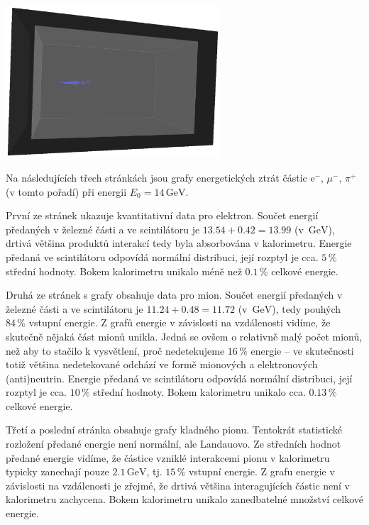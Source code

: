 \documentclass[10pt,a4paper]{article}
\renewcommand{\U}[1]{\ensuremath{\,\mathrm{#1}}}
\newcommand{\°}{\degree}
\renewcommand{\t}[1]{\mathrm{#1}}
\begin{document}
\phantom{.}
\begin{minipage}{\linewidth}
    \vspace{\baselineskip}
    \centering
    \vspace{\baselineskip}
    \includegraphics[width=0.6\textwidth]{data/kaon0S 5GeV event4.png}
    \figcaption{Rozpad $\t K^0_{\t S}$ na $2\,\pi^0$ při $5 \U{GeV}$.}
    \label{obr:kaon-neutraln}
    \bigskip
\end{minipage}

Na následujících třech stránkách jsou grafy energetických ztrát částic $\t e^- \!,\, \mu^- \!,\, \pi^+$ (v tomto pořadí) při energii $E_0 = 14 \U{GeV}$.

První ze stránek ukazuje kvantitativní data pro elektron. Součet energií předaných v železné části a ve scintilátoru je $13.54 + 0.42 = 13.99$ (v $\U{GeV}$), drtivá většina produktů interakcí tedy byla absorbována v kalorimetru. Energie předaná ve scintilátoru odpovídá normální distribuci, její rozptyl je cca. $5 \,\%$ střední hodnoty. Bokem kalorimetru unikalo méně než $0.1 \,\%$ celkové energie.

Druhá ze stránek s grafy obsahuje data pro mion. Součet energií předaných v železné části a ve scintilátoru je $11.24 + 0.48 = 11.72$ (v $\U{GeV}$), tedy pouhých $84 \,\%$ vstupní energie. Z grafů energie v závislosti na vzdálenosti vidíme, že skutečně nějaká část mionů unikla. Jedná se ovšem o relativně malý počet mionů, než aby to stačilo k vysvětlení, proč nedetekujeme $16 \,\%$ energie – ve skutečnosti totiž většina nedetekované odchází ve formě mionových a elektronových (anti)neutrin. Energie předaná ve scintilátoru odpovídá normální distribuci, její rozptyl je cca. $10 \, \%$ střední hodnoty. Bokem kalorimetru unikalo cca. $0.13 \,\%$ celkové energie.

Třetí a poslední stránka obsahuje grafy kladného pionu. Tentokrát statistické rozložení předané energie není normální, ale Landauovo. Ze středních hodnot předané energie vidíme, že částice vzniklé interakcemi pionu v kalorimetru typicky zanechají pouze $2.1 \U{GeV}$, tj. $15 \,\%$ vstupní energie. Z grafu energie v závislosti na vzdálenosti je zřejmé, že drtivá většina interagujících částic není v kalorimetru zachycena. Bokem kalorimetru unikalo zanedbatelné množství celkové energie.
\end{document}
